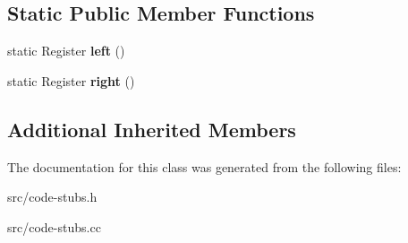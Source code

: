 \subsection*{Static Public Member Functions}
\begin{DoxyCompactItemize}
\item 
\hypertarget{classv8_1_1internal_1_1_instanceof_stub_ac31f8cae04dbdf7b1f823565209c0cac}{}static Register {\bfseries left} ()\label{classv8_1_1internal_1_1_instanceof_stub_ac31f8cae04dbdf7b1f823565209c0cac}

\item 
\hypertarget{classv8_1_1internal_1_1_instanceof_stub_a6c983ba73d3104d8ed2567130ee4ad04}{}static Register {\bfseries right} ()\label{classv8_1_1internal_1_1_instanceof_stub_a6c983ba73d3104d8ed2567130ee4ad04}

\end{DoxyCompactItemize}
\subsection*{Additional Inherited Members}


The documentation for this class was generated from the following files\+:\begin{DoxyCompactItemize}
\item 
src/code-\/stubs.\+h\item 
src/code-\/stubs.\+cc\end{DoxyCompactItemize}
